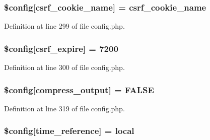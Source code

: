 \subsubsection[{\texorpdfstring{\$config}{$config}}]{\setlength{\rightskip}{0pt plus 5cm}\$config\mbox{[}\textquotesingle{}csrf\+\_\+cookie\+\_\+name\textquotesingle{}\mbox{]} = \textquotesingle{}csrf\+\_\+cookie\+\_\+name\textquotesingle{}}\hypertarget{ci_2application_2config_2config_8php_ad8f36090649afb3101c3c337c1d722a1}{}\label{ci_2application_2config_2config_8php_ad8f36090649afb3101c3c337c1d722a1}


Definition at line 299 of file config.\+php.

\subsubsection[{\texorpdfstring{\$config}{$config}}]{\setlength{\rightskip}{0pt plus 5cm}\$config\mbox{[}\textquotesingle{}csrf\+\_\+expire\textquotesingle{}\mbox{]} = 7200}\hypertarget{ci_2application_2config_2config_8php_af5c0ea7b77c40439da4f23b7cbb9c2e4}{}\label{ci_2application_2config_2config_8php_af5c0ea7b77c40439da4f23b7cbb9c2e4}


Definition at line 300 of file config.\+php.

\subsubsection[{\texorpdfstring{\$config}{$config}}]{\setlength{\rightskip}{0pt plus 5cm}\$config\mbox{[}\textquotesingle{}compress\+\_\+output\textquotesingle{}\mbox{]} = F\+A\+L\+SE}\hypertarget{ci_2application_2config_2config_8php_a5f03a6c067b921917c2d978f4991bcd1}{}\label{ci_2application_2config_2config_8php_a5f03a6c067b921917c2d978f4991bcd1}


Definition at line 319 of file config.\+php.

\subsubsection[{\texorpdfstring{\$config}{$config}}]{\setlength{\rightskip}{0pt plus 5cm}\$config\mbox{[}\textquotesingle{}time\+\_\+reference\textquotesingle{}\mbox{]} = \textquotesingle{}local\textquotesingle{}}\hypertarget{ci_2application_2config_2config_8php_acb20698e35bc3d4b9692a4b4619b1b05}{}\label{ci_2application_2config_2config_8php_acb20698e35bc3d4b9692a4b4619b1b05}



